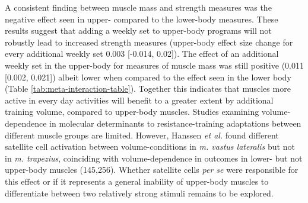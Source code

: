 \documentclass[twoside,10pt]{gihclass} %
\begin{document}
A consistent finding between muscle mass and strength measures was the negative effect seen in upper- compared to the lower-body measures.
These results suggest that adding a weekly set to upper-body programs will not robustly lead to increased strength measures (upper-body effect size change for every additional weekly set 0.003 {[}-0.014, 0.02{]}).
The effect of an additional weekly set in the upper-body for measures of muscle mass was still positive (0.011 {[}0.002, 0.021{]}) albeit lower when compared to the effect seen in the lower body (Table \ref{tab:meta-interaction-table}).
Together this indicates that muscles more active in every day activities will benefit to a greater extent by additional training volume, compared to upper-body muscles.
Studies examining volume-dependence in molecular determinants to resistance-training adaptations between different muscle groups are limited.
However, Hanssen \emph{et al.} found different satellite cell activation between volume-conditions in \emph{m. vastus lateralis} but not in \emph{m. trapezius}, coinciding with volume-dependence in outcomes in lower- but not upper-body muscles
(145,256).
Whether satellite cells \emph{per se} were responsible for this effect or if it represents a general inability of upper-body muscles to differentiate between two relatively strong stimuli remains to be explored.
\end{document}
